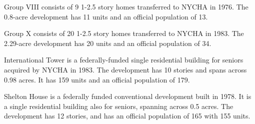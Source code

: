 Group VIII consists of 9 1-2.5 story homes transferred to NYCHA in 1976. The 0.8-acre development has 11 units and an official population of 13. 

Group X consists of 20 1-2.5 story homes transferred to NYCHA in 1983. The 2.29-acre development has 20 units and an official population of 34.

International Tower is a federally-funded single residential building for seniors acquired by NYCHA in 1983. The development has 10 stories and spans across 0.98 acres. It has 159 units and an official population of 179.

Shelton House is a federally funded conventional development built in 1978. It is a single residential building also for seniors, spanning across 0.5 acres. The development has 12 stories, and has an official population of 165 with 155 units.